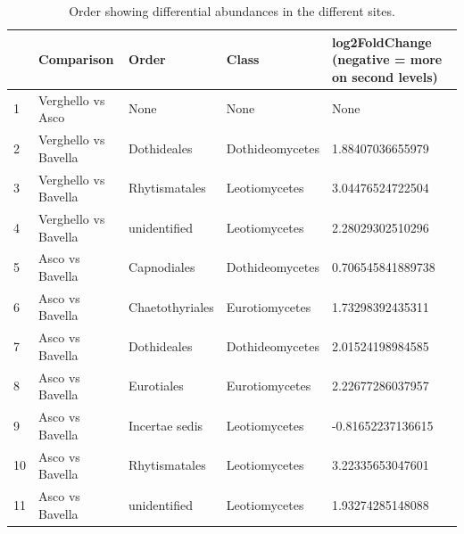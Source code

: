 \documentclass[12pt]{article}\usepackage[]{graphicx}\usepackage[]{color}
\numberwithin{figure}{section}
\begin{document}
\begin{table}[ht]
\centering
\begingroup\tiny
\begin{tabular}{lllll}
  \hline
 & Comparison & Order & Class & log2FoldChange 
 (negative = more on second levels) \\ 
  \hline
1 & Verghello vs Asco & None & None & None \\ 
  2 & Verghello vs Bavella & Dothideales & Dothideomycetes & 1.88407036655979 \\ 
  3 & Verghello vs Bavella & Rhytismatales & Leotiomycetes & 3.04476524722504 \\ 
  4 & Verghello vs Bavella & unidentified & Leotiomycetes & 2.28029302510296 \\ 
  5 & Asco vs Bavella & Capnodiales & Dothideomycetes & 0.706545841889738 \\ 
  6 & Asco vs Bavella & Chaetothyriales & Eurotiomycetes & 1.73298392435311 \\ 
  7 & Asco vs Bavella & Dothideales & Dothideomycetes & 2.01524198984585 \\ 
  8 & Asco vs Bavella & Eurotiales & Eurotiomycetes & 2.22677286037957 \\ 
  9 & Asco vs Bavella & Incertae sedis & Leotiomycetes & -0.81652237136615 \\ 
  10 & Asco vs Bavella & Rhytismatales & Leotiomycetes & 3.22335653047601 \\ 
  11 & Asco vs Bavella & unidentified & Leotiomycetes & 1.93274285148088 \\ 
   \hline
\end{tabular}
\endgroup
\caption{Order showing differential abundances in the different sites.} 
\end{table}


\cleardoublepage
\listoffigures
\listoftables
\end{document}
